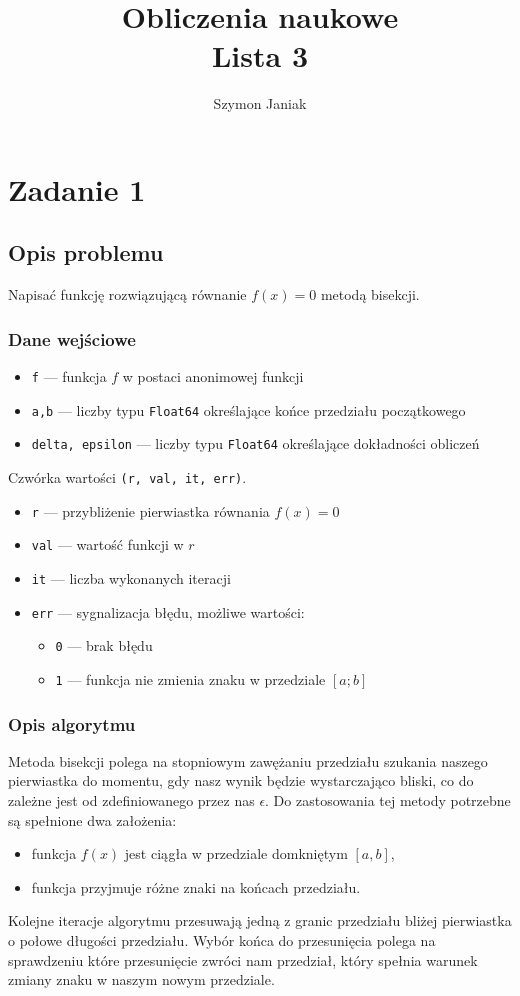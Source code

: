 \documentclass{article}
\title{%
	Obliczenia naukowe \\
	\large Lista 3}
\author{Szymon Janiak}
\begin{document}
\maketitle

\section*{Zadanie 1}
\subsection*{Opis problemu}
	Napisać funkcję rozwiązującą równanie $f(x) = 0$ metodą bisekcji.
\subsubsection*{Dane wejściowe}
	\begin{itemize}
	    \item \texttt{f} — funkcja $f$ w postaci anonimowej funkcji
	    \item \texttt{a,b} — liczby typu \texttt{Float64} określające końce przedziału początkowego
	    \item \texttt{delta, epsilon} — liczby typu \texttt{Float64} określające dokładności obliczeń
	\end{itemize}
	Czwórka wartości \texttt{(r, val, it, err)}.
	\begin{itemize}
	    \item \texttt{r} — przybliżenie pierwiastka równania $f(x) = 0$
	    \item \texttt{val} — wartość funkcji w $r$
	    \item \texttt{it} — liczba wykonanych iteracji
	    \item \texttt{err} — sygnalizacja błędu, możliwe wartości:
	    \begin{itemize}
	        \item \texttt{0} — brak błędu
	        \item \texttt{1} — funkcja nie zmienia znaku w przedziale $[a;b]$
	    \end{itemize}
	\end{itemize}
\subsubsection*{Opis algorytmu}
	Metoda bisekcji polega na stopniowym zawężaniu przedziału szukania naszego pierwiastka do momentu, gdy nasz wynik będzie wystarczająco bliski, co do zależne jest od zdefiniowanego przez nas $\epsilon$.
	Do zastosowania tej metody potrzebne są spełnione dwa założenia:
	\begin{itemize}
		\item funkcja \texttt{$f(x)$} jest ciągła w przedziale domkniętym $[a, b]$,
		\item funkcja przyjmuje różne znaki na końcach przedziału.
	\end{itemize}
	Kolejne iteracje algorytmu przesuwają jedną z granic przedziału bliżej pierwiastka o połowe długości przedziału. Wybór końca do przesunięcia polega na sprawdzeniu które przesunięcie zwróci nam przedział, który spełnia warunek zmiany znaku w naszym nowym przedziale.
\end{document}
